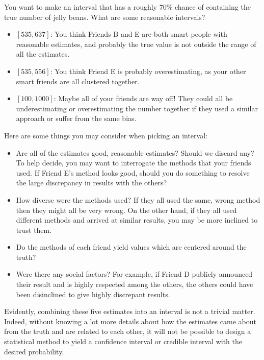 \documentclass[12pt]{article}
\begin{document}
You want to make an interval that has a roughly 70\% chance of containing the true number of jelly beans. What are some reasonable intervals?

\begin{itemize}

\item
  $[535, 637]$: You think Friends B and E are both smart people with reasonable estimates, and probably the true value is not outside the range of all the estimates.
\item
  $[535, 556]$: You think Friend E is probably overestimating, as your other smart friends are all clustered together.
\item
  $[100, 1000]$: Maybe all of your friends are way off! They could all be underestimating or overestimating the number together if they used a similar approach or suffer from the same bias.
\end{itemize}

Here are some things you may consider when picking an interval:

\begin{itemize}

\item
  Are all of the estimates good, reasonable estimates? Should we discard any? To help decide, you may want to interrogate the methods that your friends used. If Friend E's method looks good, should you do something to resolve the large discrepancy in results with the others?
\item
  How diverse were the methods used? If they all used the same, wrong method then they might all be very wrong. On the other hand, if they all used different methods and arrived at similar results, you may be more inclined to trust them.
\item
  Do the methods of each friend yield values which are centered around the truth?
\item
  Were there any social factors? For example, if Friend D publicly announced their result and is highly respected among the others, the others could have been disinclined to give highly discrepant results.
\end{itemize}

Evidently, combining these five estimates into an interval is not a trivial matter. Indeed, without knowing a lot more details about how the estimates came about from the truth and are related to each other, it will not be possible to design a statistical method to yield a confidence interval or credible interval with the desired probability.
\end{document}

